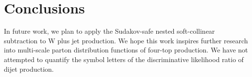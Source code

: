 \section{Conclusions}\label{sec:conclusions}

In future work, we plan to apply the Sudakov-safe nested soft-collinear
subtraction to W plus jet production. We hope this work inspires further
research into multi-scale parton distribution functions of four-top
production. We have not attempted to quantify the symbol letters of the
discriminative likelihood ratio of dijet production.

